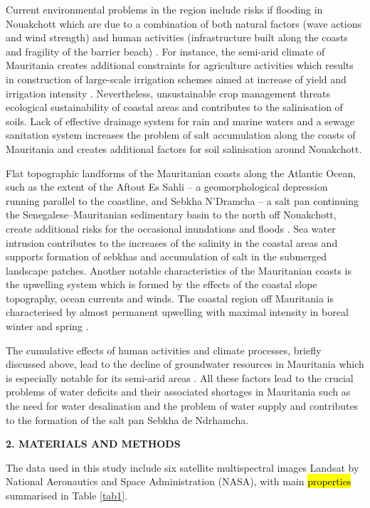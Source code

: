 \documentclass[12pt,a4paper,oneside]{article}
\def \newsection{\vspace{12pt}\textbf}
\def \newpar{\vspace{6pt}}
\begin{document}
\newpar Current environmental problems in the region include risks if flooding in Nouakchott which are due to a combination of both natural factors (wave actions and wind strength) \citep{semega2008energie} and human activities (infrastructure built along the coasts and fragility of the barrier beach) \citep{Senhoury2016,ould2007risques}. For instance, the semi-arid climate of Mauritania creates additional constraints for agriculture activities which results in construction of large-scale irrigation schemes aimed at increase of yield and irrigation intensity \citep{BORGIA20121}. Nevertheless, unsustainable crop management threats ecological sustainability of coastal areas and contributes to the salinisation of soils. Lack of effective drainage system for rain and marine waters and a sewage sanitation system increases the problem of salt accumulation along the coasts of Mauritania and creates additional factors for soil salinisation around Nouakchott. 

\newpar Flat topographic landforms of the Mauritanian coasts along the Atlantic Ocean, such as the extent of the Aftout Es Sahli -- a geomorphological depression running parallel to the coastline, and Sebkha N'Dramcha -- a salt pan continuing the Senegalese–Mauritanian sedimentary basin to the north off Nouakchott, create additional risks for the occasional inundations and floods \citep{Vermeer2010}. Sea water intrusion contributes to the increases of the salinity in the coastal areas and supports formation of sebkhas and accumulation of salt in the submerged landscape patches. Another notable characteristics of the Mauritanian coasts is the upwelling system which is formed by the effects of the coastal slope topography, ocean currents and winds. The coastal region off Mauritania is characterised by almost permanent upwelling with maximal intensity in boreal winter and spring \citep{Versteegh}.

\newpar The cumulative effects of human activities and climate processes, briefly discussed above, lead to the decline of groundwater resources in Mauritania which is especially notable for its semi-arid areas   \citep{MOHAMED2017280}. All these factors lead to the crucial problems of water deficits and their associated shortages in Mauritania such as the need for water desalination and the problem of water supply \citep{BAYODRUJULA201099} and contributes to the formation of the salt pan Sebkha de Ndrhamcha. 

\newsection {2. MATERIALS AND METHODS}

\newpar The data used in this study include six satellite multispectral images Landsat by National Aeronautics and Space Administration (NASA), with main \hl{properties} summarised in Table \ref{tab1}. 
\end{document}
